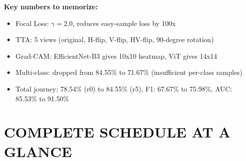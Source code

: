 \documentclass[12pt,a4paper]{article}
\begin{document}
\vspace{0.3cm}
\noindent\textbf{Key numbers to memorize:}
\begin{itemize}
    \item Focal Loss: $\gamma=2.0$, reduces easy-sample loss by 100x
    \item TTA: 5 views (original, H-flip, V-flip, HV-flip, 90-degree rotation)
    \item Grad-CAM: EfficientNet-B3 gives 10x10 heatmap, ViT gives 14x14
    \item Multi-class: dropped from 84.55\% to 71.67\% (insufficient per-class samples)
    \item Total journey: 78.54\% (r0) to 84.55\% (r5), F1: 67.67\% to 75.98\%, AUC: 85.53\% to 91.50\%
\end{itemize}

\part*{COMPLETE SCHEDULE AT A GLANCE}
\end{document}
